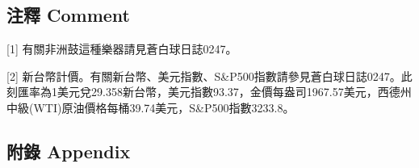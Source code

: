 \documentclass[
]{article}
\begin{document}
\hypertarget{ux6ce8ux91cb-comment-30}{%
\subsection{注釋 Comment}\label{ux6ce8ux91cb-comment-30}}

{[}1{]} 有關非洲鼓這種樂器請見蒼白球日誌0247。

{[}2{]}
新台幣計價。有關新台幣、美元指數、S\&P500指數請參見蒼白球日誌0247。此刻匯率為1美元兌29.358新台幣，美元指數93.37，金價每盎司1967.57美元，西德州中級(WTI)原油價格每桶39.74美元，S\&P500指數3233.8。

\hypertarget{ux9644ux9304-appendix-30}{%
\subsection{附錄 Appendix}\label{ux9644ux9304-appendix-30}}
\end{document}
